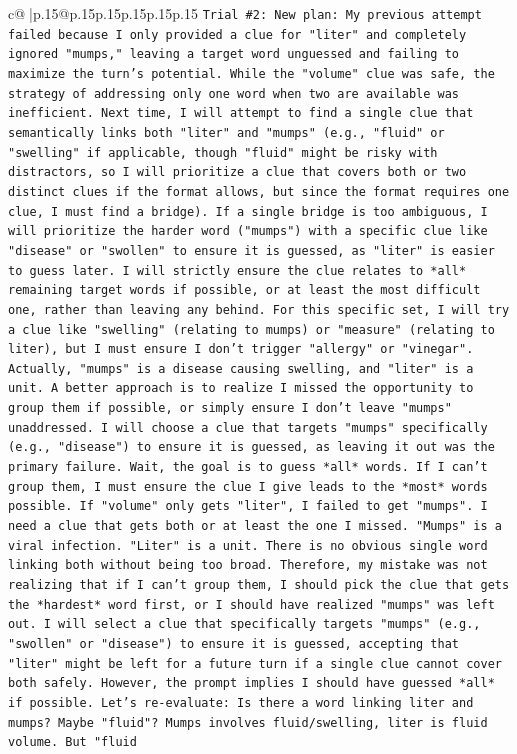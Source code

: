 \documentclass{article}
\begin{document}
{\begin{supertabular}{c@{$\;$}|p{.15\linewidth}@{}p{.15\linewidth}p{.15\linewidth}p{.15\linewidth}p{.15\linewidth}p{.15\linewidth}}
{{{\texttt{Trial \#2: New plan: My previous attempt failed because I only provided a clue for "liter" and completely ignored "mumps," leaving a target word unguessed and failing to maximize the turn's potential. While the "volume" clue was safe, the strategy of addressing only one word when two are available was inefficient. Next time, I will attempt to find a single clue that semantically links both "liter" and "mumps" (e.g., "fluid" or "swelling" if applicable, though "fluid" might be risky with distractors, so I will prioritize a clue that covers both or two distinct clues if the format allows, but since the format requires one clue, I must find a bridge). If a single bridge is too ambiguous, I will prioritize the harder word ("mumps") with a specific clue like "disease" or "swollen" to ensure it is guessed, as "liter" is easier to guess later. I will strictly ensure the clue relates to *all* remaining target words if possible, or at least the most difficult one, rather than leaving any behind. For this specific set, I will try a clue like "swelling" (relating to mumps) or "measure" (relating to liter), but I must ensure I don't trigger "allergy" or "vinegar". Actually, "mumps" is a disease causing swelling, and "liter" is a unit. A better approach is to realize I missed the opportunity to group them if possible, or simply ensure I don't leave "mumps" unaddressed. I will choose a clue that targets "mumps" specifically (e.g., "disease") to ensure it is guessed, as leaving it out was the primary failure. Wait, the goal is to guess *all* words. If I can't group them, I must ensure the clue I give leads to the *most* words possible. If "volume" only gets "liter", I failed to get "mumps". I need a clue that gets both or at least the one I missed. "Mumps" is a viral infection. "Liter" is a unit. There is no obvious single word linking both without being too broad. Therefore, my mistake was not realizing that if I can't group them, I should pick the clue that gets the *hardest* word first, or I should have realized "mumps" was left out. I will select a clue that specifically targets "mumps" (e.g., "swollen" or "disease") to ensure it is guessed, accepting that "liter" might be left for a future turn if a single clue cannot cover both safely. However, the prompt implies I should have guessed *all* if possible. Let's re{-}evaluate: Is there a word linking liter and mumps? Maybe "fluid"? Mumps involves fluid/swelling, liter is fluid volume. But "fluid} \\
\\ 
}}}
\end{supertabular}}
\end{document}
